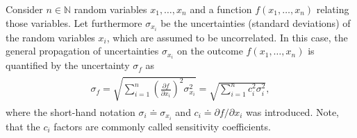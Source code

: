 \documentclass[a4paper,11pt, twocolumn]{article}
\begin{document}
Consider $n \in \mathbb{N}$ random variables $x_1,\dots,x_n$ and a function $f(x_1,\dots,x_n)$ relating those variables. Let furthermore $\sigma_{x_i}$ be the uncertainties (standard deviations) of the random variables $x_i$, which are assumed to be uncorrelated. In this case, the general propagation of uncertainties $\sigma_{x_i}$ on the outcome $f(x_1,\dots,x_n)$ is quantified by the uncertainty $\sigma_f$ as \begin{gather}\label{eq:generallawpropagationofuncertainties}
		\begin{gathered}\sigma_f = \sqrt{\sum_{i=1}^{n}\left(\frac{\partial f}{\partial x_i}\right)^2 \sigma_{x_i}^2} = \sqrt{\sum_{i=1}^{n}c_i^2 \sigma_{i}^2},
\end{gathered}\end{gather} where the short-hand notation $\sigma_i \doteq \sigma_{x_i}$ and $c_i \doteq \partial f/\partial x_i$ was introduced. Note, that the $c_i$ factors are commonly called sensitivity coefficients.





\end{document}
